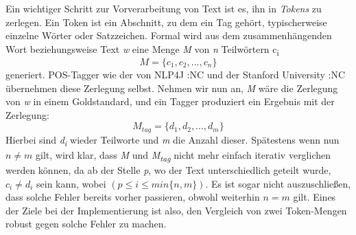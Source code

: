Ein wichtiger Schritt zur Vorverarbeitung von Text ist es, ihn in \textit{Tokens} zu zerlegen. Ein Token ist ein Abschnitt, zu dem ein Tag gehört, typischerweise einzelne Wörter oder Satzzeichen. Formal wird aus dem zusammenhängenden Wort beziehungsweise Text \textit{w} eine Menge \textit{M} von \textit{n} Teilwörtern c\textsubscript{i} 
 \[  M = \{ c_1 , c_2 , ... , c_n \} \] 
 generiert. POS-Tagger wie der von NLP4J :NC und der Stanford University :NC übernehmen diese Zerlegung selbst. Nehmen wir nun an, \textit{M} wäre die Zerlegung von \textit{w} in einem Goldstandard, und ein Tagger produziert ein Ergebnis mit der Zerlegung:
 \[  M_{tag} = \{ d_1 , d_2 , ... , d_m \} \]
Hierbei sind \textit{d\textsubscript{i}} wieder Teilworte und \textit{m} die Anzahl dieser. Spätestens wenn nun $n \neq m$ gilt, wird klar, dass \textit{M} und \textit{M\textsubscript{tag}} nicht mehr einfach iterativ verglichen werden können, da ab der Stelle \textit{p}, wo der Text unterschiedlich geteilt wurde, $ c_i \neq d_i $ sein kann, wobei $ (p \leq i \leq min\{ n, m \}) $. Es ist sogar nicht auszuschließen, dass solche Fehler bereits vorher passieren, obwohl weiterhin $n = m$ gilt.
\newline
Eines der Ziele bei der Implementierung ist also, den Vergleich von zwei Token-Mengen robust gegen solche Fehler zu machen.
%
%
%
%
%



